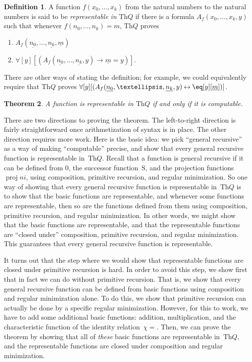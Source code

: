 \documentclass[10pt,a4paper]{article}
\theoremstyle{plain}
\newtheorem{thm}{Theorem}[section]
\theoremstyle{definition}
\newtheorem{defn}[thm]{Definition}
\theoremstyle{remark}
\newcommand*{\ollabel}[1]{\label{#1}}
\providecommand{\lif}{\mathbin{\rightarrow}}
\providecommand{\lforall}{\mathord{\forall}}
\providecommand{\Th}{\ensuremath{\mathrm{Th}}}
\providecommand{\num}[1]{\underline{#1}}
\providecommand{\Zero}{\ensuremath{0}}
\providecommand{\Succ}{\ensuremath{\mathrm{S}}}
\providecommand{\Char}{\chi}
\providecommand{\Proj}{\operatorname{proj}}
\providecommand{\liff}{\mathbin{\leftrightarrow}}
\begin{document}
\begin{defn}
\ollabel{defn:representable-fn}
  A function $f(x_0,\ldots,x_k)$ from the natural numbers to
  the natural numbers is said to be {\em representable in $\Th{Q}$} if
  there is a formula $A_f(x_0,\dots,x_k,y)$ such that whenever
  $f(n_0,\dots,n_k) = m$, $\Th{Q}$ proves
\begin{enumerate}
\item\ollabel{defn:rep:a} $A_f(\num{n_0}, \dots, \num{n_k}, \num{m})$
\item\ollabel{defn:rep:b} $\lforall[y][(A_f(\num{n_0}, \dots,
\num{n_k}, y) \lif \num{m} = y)]$.
\end{enumerate}
\end{defn}

There are other ways of stating the definition; for example, we could
equivalently require that $\Th{Q}$ proves $\lforall[y][(A_f(\num{n_0}, \dots,
\num{n_k}, y) \liff \eq[y][\num{m}])]$.

\begin{thm}
\ollabel{thm:representable-iff-comp}
A function is representable in $\Th{Q}$ if and only if it is computable.
\end{thm}

There are two directions to proving the theorem. The left-to-right
direction is fairly straightforward once arithmetization of syntax is
in place. The other direction requires more work.  Here is the basic
idea: we pick ``general recursive'' as a way of making ``computable''
precise, and show that every general recursive function is
representable in~$\Th{Q}$. Recall that a function is general recursive
if it can be defined from $\Zero$, the successor function~$\Succ$, and the
projection functions~$\Proj{n}{i}$, using composition, primitive recursion,
and regular minimization. So one way of showing that every general
recursive function is representable in~$\Th{Q}$ is to show that the
basic functions are representable, and whenever some functions are
representable, then so are the functions defined from them using
composition, primitive recursion, and regular minimization. In other
words, we might show that the basic functions are representable, and
that the representable functions are ``closed under'' composition,
primitive recursion, and regular minimization.  This guarantees that
every general recursive function is representable.

It turns out that the step where we would show that representable
functions are closed under primitive recursion is hard. In order to
avoid this step, we show first that in fact we can do without
primitive recursion. That is, we show that every general recursive
function can be defined from basic functions using composition and
regular minimization alone.  To do this, we show that primitive
recursion can actually be done by a specific regular minimization.
However, for this to work, we have to add some additional basic
functions: addition, multiplication, and the characteristic function
of the identity relation~$\Char{=}$.  Then, we can prove the theorem
by showing that all of \emph{these} basic functions are representable
in~$\Th{Q}$, and the representable functions are closed under
composition and regular minimization.
\end{document}
